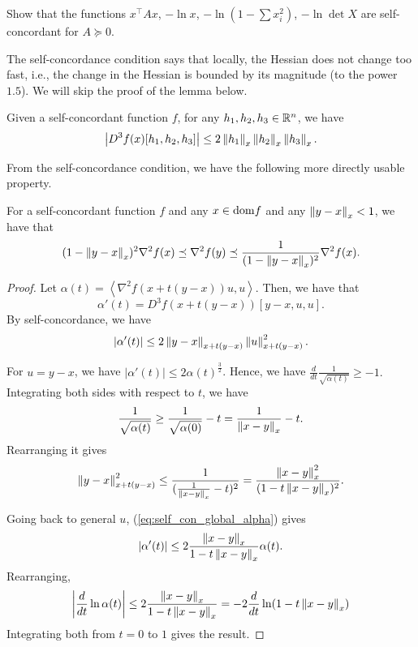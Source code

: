 \begin{xca}
Show that the functions $x^{\top}Ax$, $-\ln x$, $-\ln(1-\sum x^{2}_{i})$,
$-\ln\det X$ are self-concordant for $A\succeq0$.
\end{xca}

The self-concordance condition says that locally, the Hessian does
not change too fast, i.e., the change in the Hessian is bounded by
its magnitude (to the power $1.5$). We will skip the proof of the
lemma below.
\begin{lem}
Given a self-concordant function $f$, for any $h_{1},h_{2},h_{3}\in\mathbb{R}^{n}$,
we have 
\[
\left|D^{3}f(x)[h_{1},h_{2},h_{3}]\right|\leq2\left\Vert h_{1}\right\Vert_{x}\left\Vert h_{2}\right\Vert_{x}\left\Vert h_{3}\right\Vert_{x}.
\]
\end{lem}

From the self-concordance condition, we have the following more directly
usable property.
\begin{lem}
\label{lem:self_con_global}For a self-concordant function $f$ and
any $x\in\mathrm{dom} f$ and any $\left\Vert y-x\right\Vert_{x}<1$, we have that
\[
(1-\left\Vert y-x\right\Vert_{x})^{2}\nabla^{2}f(x)\preceq\nabla^{2}f(y)\preceq\frac{1}{(1-\left\Vert y-x\right\Vert_{x})^{2}}\nabla^{2}f(x).
\]
\end{lem}

\begin{proof}
Let $\alpha(t)=\left\langle \nabla^{2}f(x+t(y-x))u,u\right\rangle $.
Then, we have that 
\[
\alpha'(t)=D^{3}f(x+t(y-x))[y-x,u,u].
\]
By self-concordance, we have
\begin{equation}
\left|\alpha'(t)\right|\leq2\left\Vert y-x\right\Vert_{x+t(y-x)}\left\Vert u\right\Vert^{2}_{x+t(y-x)}.\label{eq:self_con_global_alpha}
\end{equation}

For $u=y-x$, we have $\left|\alpha'(t)\right|\leq2\alpha(t)^{\frac{3}{2}}$.
Hence, we have $\frac{d}{dt}\frac{1}{\sqrt{\alpha(t)}}\geq-1.$ Integrating
both sides with respect to $t$, we have
\[
\frac{1}{\sqrt{\alpha(t)}}\geq\frac{1}{\sqrt{\alpha(0)}}-t=\frac{1}{\left\Vert x-y\right\Vert_{x}}-t.
\]
Rearranging it gives
\[
\left\Vert y-x\right\Vert^{2}_{x+t(y-x)}\leq\frac{1}{(\frac{1}{\left\Vert x-y\right\Vert_{x}}-t)^{2}}=\frac{\left\Vert x-y\right\Vert^{2}_{x}}{(1-t\left\Vert x-y\right\Vert_{x})^{2}}.
\]

Going back to general $u$, (\ref{eq:self_con_global_alpha}) gives
\[
\left|\alpha'(t)\right|\leq2\frac{\left\Vert x-y\right\Vert_{x}}{1-t\left\Vert x-y\right\Vert_{x}}\alpha(t).
\]
Rearranging,
\[
\left|\frac{d}{dt}\ln\alpha(t)\right|\leq2\frac{\left\Vert x-y\right\Vert_{x}}{1-t\left\Vert x-y\right\Vert_{x}}=-2\frac{d}{dt}\ln(1-t\left\Vert x-y\right\Vert_{x})
\]
Integrating both from $t=0$ to $1$ gives the result.
\end{proof}

